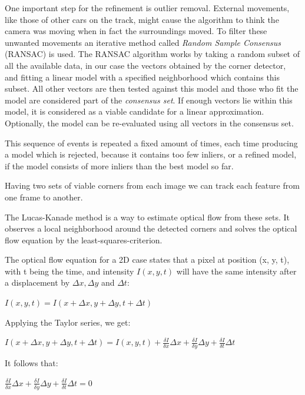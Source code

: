 One important step for the refinement is outlier removal. External movements, like those of other cars on the track, might cause the algorithm to think the camera was moving when in fact the surroundings moved.
To filter these unwanted movements an iterative method called \textit{Random Sample Consensus} (RANSAC) is used. 
The RANSAC algorithm works by taking a random subset of all the available data, in our case the vectors obtained by the corner detector, and fitting a linear model with a specified neighborhood which contains this subset. All other vectors are then tested against this model and those who fit the model are considered part of the \textit{consensus set}.
If enough vectors lie within this model, it is considered as a viable candidate for a linear approximation. Optionally, the model can be re-evaluated using all vectors in the consensus set.

This sequence of events is repeated a fixed amount of times, each time producing a model which is rejected, because it contains too few inliers, or a refined model, if the model consists of more inliers than the best model so far.

Having two sets of viable corners from each image we can track each feature from one frame to another. 

The Lucas-Kanade method \cite{lucas81, tomasi91} is a way to estimate optical flow from these sets. It observes a local neighborhood around the detected corners and solves the optical flow equation by the least-squares-criterion.

The optical flow equation for a 2D case states that a pixel at position (x, y, t), with t being the time, and intensity $I(x, y, t)$ will have the same intensity after a displacement by $\Delta x, \Delta y$ and $\Delta t$:

\begin{center}
\large
$I(x, y, t) = I(x + \Delta x, y + \Delta y, t + \Delta t)$
\normalsize
\end{center}

Applying the Taylor series, we get:

\begin{center}
\large
$I(x + \Delta x, y + \Delta y, t + \Delta t) = I(x, y, t) + \frac{\delta I}{\delta x}\Delta x + \frac{\delta I}{\delta y}\Delta y + \frac{\delta I}{\delta t}\Delta t$
\normalsize
\end{center}

It follows that: 

\begin{center}
\large
$\frac{\delta I}{\delta x}\Delta x + \frac{\delta I}{\delta y}\Delta y + \frac{\delta I}{\delta t}\Delta t = 0$
\normalsize
\end{center}

